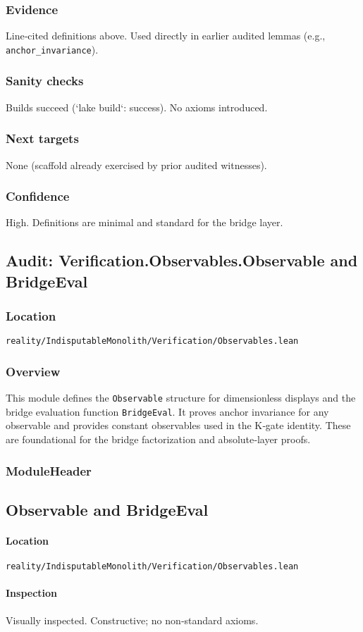 \documentclass{article}
\newcommand{\FileRef}[1]{\texttt{#1}}
\newcommand{\ModuleHeader}[3]{%
  \subsection{#1}
  \paragraph{Location} \FileRef{#2}\\
  \paragraph{Inspection} #3
}
\begin{document}
\subsubsection{Evidence}
Line‑cited definitions above. Used directly in earlier audited lemmas (e.g., \texttt{anchor\_invariance}).

\subsubsection{Sanity checks}
Builds succeed (`lake build`: success). No axioms introduced.

\subsubsection{Next targets}
None (scaffold already exercised by prior audited witnesses).

\subsubsection{Confidence}
High. Definitions are minimal and standard for the bridge layer.

\subsection{Audit: Verification.Observables.Observable and BridgeEval}
\subsubsection{Location}
\FileRef{reality/IndisputableMonolith/Verification/Observables.lean}

\subsubsection{Overview}
This module defines the \texttt{Observable} structure for dimensionless displays and the bridge evaluation function \texttt{BridgeEval}. It proves anchor invariance for any observable and provides constant observables used in the K‑gate identity. These are foundational for the bridge factorization and absolute‑layer proofs.

\subsubsection{ModuleHeader}
\ModuleHeader{Observable and BridgeEval}{reality/IndisputableMonolith/Verification/Observables.lean}{Visually inspected. Constructive; no non‑standard axioms.}
\end{document}

